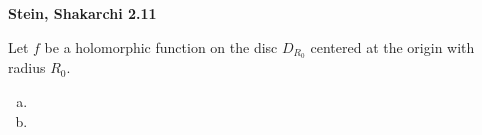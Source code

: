 \textbf{Stein, Shakarchi 2.11}

Let $f$ be a holomorphic function on the disc $D_{R_0}$ centered at the origin with radius $R_0$.

\begin{enumerate}[(a)]
    \item 
    \pagebreak
    \item 
\end{enumerate}